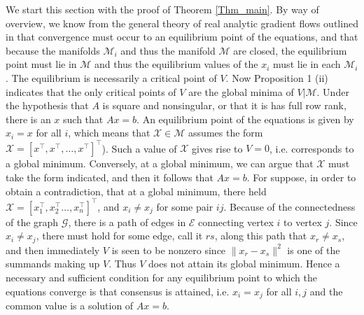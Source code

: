 \documentclass{aims}
\begin{document}
We start this section with the proof of Theorem \ref{Thm_main}. By way of overview, we know from the general theory of
 real analytic gradient flows outlined in \cite{KTA00Math} that convergence must occur to an equilibrium point of the equations, and that because the manifolds $\mathcal M_i$ and thus the manifold $\mathcal M$ are closed, the equilibrium point must lie in $\mathcal M$ and thus the equilibrium values of the $x_i$ must lie in each $\mathcal M_i$. The equilibrium is necessarily a critical point of $V$. Now Proposition 1 (ii) indicates that the only critical points of $V$ are the global minima of $V|\mathcal M$. Under the hypothesis that $A$ is square and nonsingular, or that it is has full row rank, there is an $x$ such that $Ax=b$. An equilibrium point of the equations is given by $x_i =x$ for all $i$, which means that $\mathcal X\in\mathcal M$  assumes the form $\mathcal X=[x^{\top},x^{\top},\dots ,x^{\top}]^{\top}$). Such a value of $\mathcal X$ gives rise to $V=0$, i.e. corresponds to a global minimum. Conversely, at a global minimum, we can argue that  $\mathcal  X$ must take the form indicated, and then it follows that $Ax=b$. For suppose, in order to obtain a contradiction, that at a global minimum, there held $\mathcal X=[x_1^{\top},x_2^{\top}\ldots,x_n^{\top}]^{\top}$, and $x_i \neq x_j$ for some pair $ij$. Because of the connectedness of the graph $\mathcal G$, there is a path of edges in $\mathcal E$ connecting vertex $i$ to vertex $j$. Since $x_i \neq x_j$, there must hold for some edge, call it $rs$, along this path that $x_r\neq x_s$, and then immediately $V$ is seen to be nonzero since $\|x_r-x_s\|^2$ is one of the summands making up $V$.
Thus $V$ does not attain its global minimum. Hence a necessary and sufficient condition for any equilibrium point to which the equations converge is that consensus is attained, i.e. $x_i=x_j$ for all $i,j$ and the common value is a solution of $Ax=b$.
\end{document}
